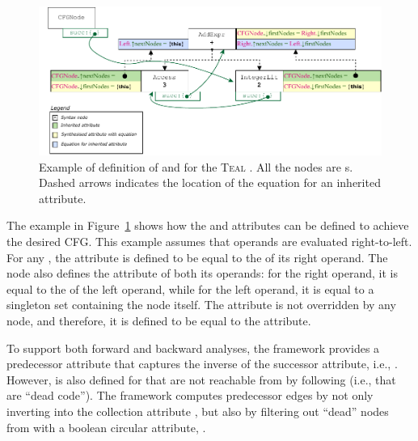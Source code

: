 \begin{figure}[H]
    \centering
    \includegraphics[width=1\textwidth]{kappa/img/IntraCFGExample1.pdf}
    \caption{\label{fig:IntraCFGExample} Example of definition of   and  for the \textsc{Teal} . 
    All the nodes are s. Dashed arrows indicates the location of the equation for an inherited attribute.
    }
\end{figure}
The example in Figure~\ref{fig:IntraCFGExample} shows how the  and
 attributes can be defined to achieve the desired CFG.
This example assumes that operands are evaluated right-to-left. 
For any , the  attribute is defined to 
be equal to the  of its right operand. The  node
also defines the  attribute of both its operands: 
for the right operand, it is equal to the  of the left operand,
while for the left operand, it is equal to a singleton set containing the  node itself.
The  attribute is not overridden by any node, and 
therefore, it is defined to be equal to the  attribute.


To support both forward and backward analyses, the framework provides a predecessor
attribute that captures the inverse of the successor attribute, i.e., . However, 
 is also defined for  that are not reachable from  by following 
 (i.e., that are ``dead code''). The framework computes predecessor edges  
by not only inverting  into the collection attribute , but also by 
filtering out ``dead'' nodes from  with a boolean circular attribute, 
.

